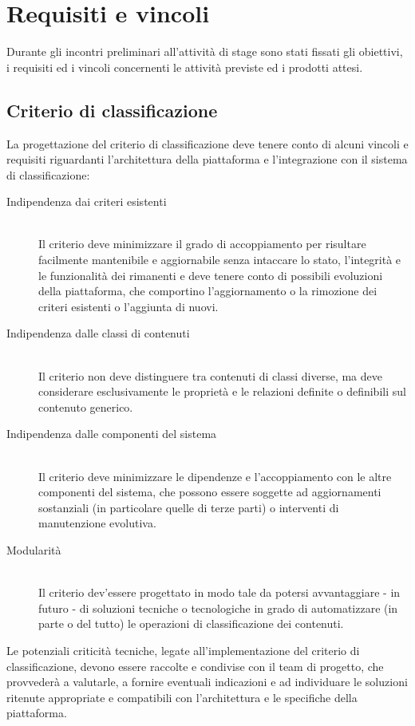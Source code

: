 \section{Requisiti e vincoli}
\label{sec:tesi:progetto:requisiti}
Durante gli incontri preliminari all'attività di stage sono stati fissati gli obiettivi, i requisiti ed i vincoli concernenti le attività previste ed i prodotti attesi. 

\subsection{Criterio di classificazione}
\label{sec:tesi:progetto:requisiti:criterio-classificazione}
La progettazione del criterio di classificazione deve tenere conto di alcuni vincoli e requisiti riguardanti l'architettura della piattaforma e l'integrazione con il sistema di classificazione:

\begin{description}
	\item[Indipendenza dai criteri esistenti] \hfill \\
	Il criterio deve minimizzare il grado di accoppiamento per risultare facilmente mantenibile e aggiornabile senza intaccare lo stato, l'integrità e le funzionalità dei rimanenti e deve tenere conto di possibili evoluzioni della piattaforma, che comportino l'aggiornamento o la rimozione dei criteri esistenti o l'aggiunta di nuovi.
	\item[Indipendenza dalle classi di contenuti] \hfill \\
	Il criterio non deve distinguere tra contenuti di classi diverse, ma deve considerare esclusivamente le proprietà e le relazioni definite o definibili sul contenuto generico.
	\item[Indipendenza dalle componenti del sistema] \hfill \\
	Il criterio deve minimizzare le dipendenze e l'accoppiamento con le altre componenti del sistema, che possono essere soggette ad aggiornamenti sostanziali (in particolare quelle di terze parti) o interventi di manutenzione evolutiva.
	\item[Modularità] \hfill \\
	Il criterio dev'essere progettato in modo tale da potersi avvantaggiare - in futuro - di soluzioni tecniche o tecnologiche in grado di automatizzare (in parte o del tutto) le operazioni di classificazione dei contenuti.
\end{description}

Le potenziali criticità tecniche, legate all'implementazione del criterio di classificazione, devono essere raccolte e condivise con il team di progetto, che provvederà a valutarle, a fornire eventuali indicazioni e ad individuare le soluzioni ritenute appropriate e compatibili con l'architettura e le specifiche della piattaforma.

